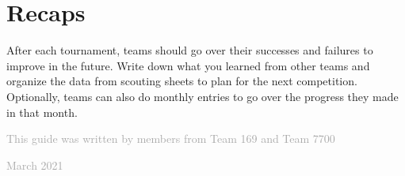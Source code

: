 \documentclass[letterpaper, 12pt]{article}
\begin{document}
\section*{Recaps}

After each tournament, teams should go over their successes and failures to improve in the future. Write down what you learned from other teams and organize the data from scouting sheets to plan for the next competition. Optionally, teams can also do monthly entries to go over the progress they made in that month.

\vspace{1.2in}

\begin{center}
\textcolor{darkgray}{This guide was written by members from Team 169 and Team 7700}

\vspace{0.1in}

\textcolor{darkgray}{March 2021}
\end{center}
\end{document}
